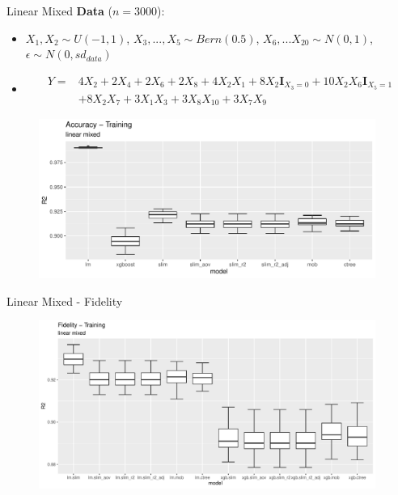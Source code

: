 \documentclass[9pt, xcolor=table]{beamer}
\begin{document}
\begin{frame}{Linear Mixed}
\textbf{Data} ($n= 3000$):
\begin{itemize}
    \item $X_1, X_2 \sim U(-1,1)$, $X_3, ..., X_5 \sim Bern(0.5)$, $X_6, ... X_20 \sim N(0,1)$,  $\epsilon \sim N(0, sd_{data})$
    \item \begin{align*}
    Y = & 4   X_2 + 2   X_4 + 2   X_6 + 2   X_8 + 4   X_2   X_1 + 8   X_2   \mathbf{I}_{X_3 = 0} + 10   X_2   X_6    \mathbf{I}_{X_5 = 1} \\
    & + 8   X_2   X_7 + 3   X_1   X_3 + 3   X_8   X_{10} + 3   X_7   X_9     
    \end{align*}
    
\end{itemize}

\begin{figure}
    \includegraphics[width=11cm]{Figures/Performance/linear_mixed/r2_acc_train.pdf}
\end{figure}
\end{frame}

\begin{frame}{Linear Mixed - Fidelity}
\begin{figure}
    \includegraphics[width=11cm]{Figures/Performance/linear_mixed/r2_fidelity_train.pdf}
\end{figure}
\end{frame}
\end{document}
